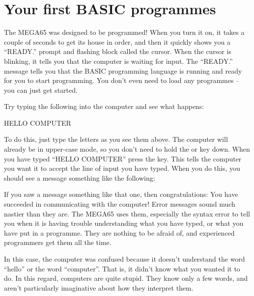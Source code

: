 \section{Your first BASIC programmes}

The MEGA65 was designed to be programmed! When you turn it on,
it takes a couple of seconds to get its house in order, and then
it quickly shows you a ``READY.'' prompt and flashing block called
the cursor.  When the cursor is blinking, it tells you that the
computer is waiting for input.  The ``READY.'' message tells you
that the BASIC programming language is running and ready for you to
start programming.  You don't even need to load any programmes --
you can just get started.

\needspace{4cm} %
Try typing the following into the computer and see what happens:

\begin{screenoutput}
HELLO COMPUTER
\end{screenoutput}

\needspace{4cm} %

To do this, just type the letters as you see them above.  The computer
will already be in upper-case mode, so you don't need to hold the 
or  key down.  When you have typed ``HELLO COMPUTER'' press
  the  key.  This tells the computer you want it to accept the
  line of input you have typed.  When you do this, you should see a message something
  like the following:

  
  If you saw a  message something like that one, then congratulations:
  You have succeeded in communicating with the computer!
  Error messages sound much nastier than they are.  The MEGA65 uses them, especially
  the syntax error to tell you when it is having trouble understanding what you have
  typed, or what you have put in a programme.  They are nothing to be afraid of, and
  experienced programmers get them all the time.

  In this case, the computer was confused because it doesn't understand the word
  ``hello'' or the word ``computer''.  That is, it didn't know what you wanted it to
  do.  In this regard, computers are quite stupid. They know only a few words, and
  aren't particularly imaginative about how they interpret them.

